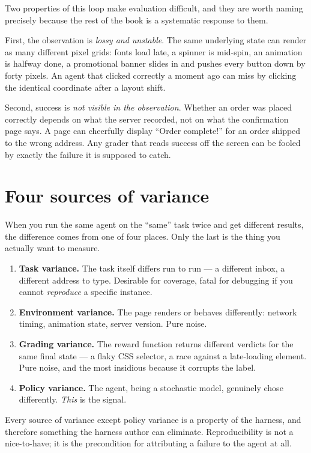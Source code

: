\documentclass[11pt,openany]{book}
\newcounter{exc}[chapter]
\begin{document}
Two properties of this loop make evaluation difficult, and they are worth naming
precisely because the rest of the book is a systematic response to them.

First, the observation is \emph{lossy and unstable}. The same underlying state
can render as many different pixel grids: fonts load late, a spinner is mid-spin,
an animation is halfway done, a promotional banner slides in and pushes every
button down by forty pixels. An agent that clicked correctly a moment ago can
miss by clicking the identical coordinate after a layout shift.

Second, success is \emph{not visible in the observation}. Whether an order was
placed correctly depends on what the server recorded, not on what the
confirmation page says. A page can cheerfully display ``Order complete!'' for an
order shipped to the wrong address. Any grader that reads success off the screen
can be fooled by exactly the failure it is supposed to catch.

\section{Four sources of variance}

When you run the same agent on the ``same'' task twice and get different results,
the difference comes from one of four places. Only the last is the thing you
actually want to measure.

\begin{enumerate}[leftmargin=1.6em,itemsep=4pt]
\item \textbf{Task variance.} The task itself differs run to run — a different
inbox, a different address to type. Desirable for coverage, fatal for debugging
if you cannot \emph{reproduce} a specific instance.
\item \textbf{Environment variance.} The page renders or behaves differently:
network timing, animation state, server version. Pure noise.
\item \textbf{Grading variance.} The reward function returns different verdicts
for the same final state — a flaky CSS selector, a race against a late-loading
element. Pure noise, and the most insidious because it corrupts the label.
\item \textbf{Policy variance.} The agent, being a stochastic model, genuinely
chose differently. \emph{This} is the signal.
\end{enumerate}

\begin{principle}[.\ ]
Every source of variance except policy variance is a property of the harness, and
therefore something the harness author can eliminate. Reproducibility is not a
nice-to-have; it is the precondition for attributing a failure to the agent at
all.
\end{principle}
\end{document}
